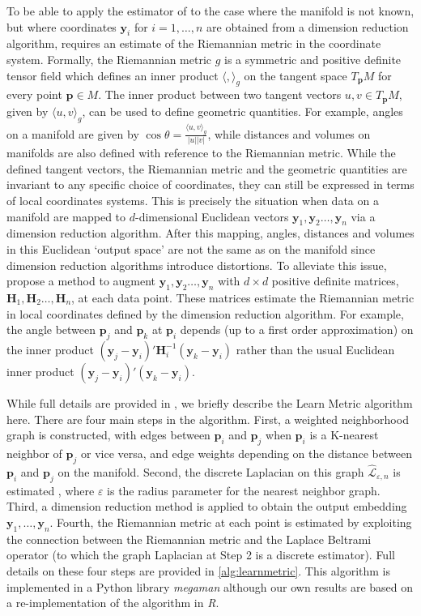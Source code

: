 \documentclass[11pt,a4paper,]{article}
\begin{document}
To be able to apply the estimator of \textcite{Pelletier2005-vu} to the case where the manifold is not known, but where coordinates \(\pmb{y}_i\) for \(i=1,\dots,n\) are obtained from a dimension reduction algorithm, requires an estimate of the Riemannian metric in the coordinate system. Formally, the Riemannian metric \(g\) is a symmetric and positive definite tensor field which defines an inner product \(\langle,\rangle_g\) on the tangent space \(T_{\pmb{p}} M\) for every point \(\pmb{p} \in M\). The inner product between two tangent vectors \(u,v \in T_{\pmb{p}}M\), given by \(\langle u,v \rangle_g\), can be used to define geometric quantities. For example, angles on a manifold are given by \(\cos{\theta}=\frac{\langle u,v \rangle_g}{|u| |v|}\), while distances and volumes on manifolds are also defined with reference to the Riemannian metric. While the defined tangent vectors, the Riemannian metric and the geometric quantities are invariant to any specific choice of coordinates, they can still be expressed in terms of local coordinates systems. This is precisely the situation when data on a manifold are mapped to \(d\)-dimensional Euclidean vectors \(\pmb{y}_1,\pmb{y}_2\dots,\pmb{y}_n\) via a dimension reduction algorithm. After this mapping, angles, distances and volumes in this Euclidean `output space' are not the same as on the manifold since dimension reduction algorithms introduce distortions. To alleviate this issue, \textcite{Perrault-Joncas2013-pq} propose a method to augment \(\pmb{y}_1,\pmb{y}_2\dots,\pmb{y}_n\) with \(d\times d\) positive definite matrices, \(\pmb{H}_1,\pmb{H}_2\dots,\pmb{H}_n\), at each data point. These matrices estimate the Riemannian metric in local coordinates defined by the dimension reduction algorithm. For example, the angle between \(\pmb{p}_j\) and \(\pmb{p}_k\) at \(\pmb{p}_i\) depends (up to a first order approximation) on the inner product \((\pmb{y}_j-\pmb{y}_i)'\pmb{H}^{-1}_i(\pmb{y}_k-\pmb{y}_i)\) rather than the usual Euclidean inner product \((\pmb{y}_j-\pmb{y}_i)'(\pmb{y}_k-\pmb{y}_i)\).

While full details are provided in \textcite{Perrault-Joncas2013-pq}, we briefly describe the Learn Metric algorithm here. There are four main steps in the algorithm. First, a weighted neighborhood graph is constructed, with edges between \(\pmb{p}_i\) and \(\pmb{p}_j\) when \(\pmb{p}_i\) is a K-nearest neighbor of \(\pmb{p}_j\) or vice versa, and edge weights depending on the distance between \(\pmb{p}_i\) and \(\pmb{p}_j\) on the manifold. Second, the discrete Laplacian on this graph \(\hat{\mathcal{L}}_{\varepsilon,n}\) is estimated \autocite{Zhou2011-za}, where \(\varepsilon\) is the radius parameter for the nearest neighbor graph. Third, a dimension reduction method is applied to obtain the output embedding \(\pmb{y}_1,\dots,\pmb{y}_n\). Fourth, the Riemannian metric at each point is estimated by exploiting the connection between the Riemannian metric and the Laplace Beltrami operator (to which the graph Laplacian at Step 2 is a discrete estimator). Full details on these four steps are provided in \autoref{alg:learnmetric}. This algorithm is implemented in a Python library \emph{megaman} \autocite{McQueen2016-xz} although our own results are based on a re-implementation of the algorithm in \emph{R}.
\end{document}
